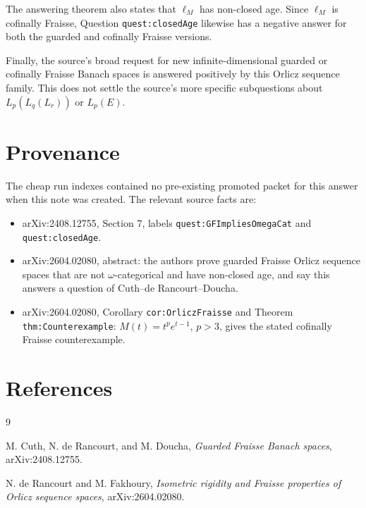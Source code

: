 \documentclass[11pt]{amsart}
\begin{document}
The answering theorem also states that \(\ell_M\) has non-closed age. Since
\(\ell_M\) is cofinally Fraisse, Question \texttt{quest:closedAge} likewise
has a negative answer for both the guarded and cofinally Fraisse versions.

Finally, the source's broad request for new infinite-dimensional guarded or
cofinally Fraisse Banach spaces is answered positively by this Orlicz sequence
family. This does not settle the source's more specific subquestions about
\(L_p(L_q(L_r))\) or \(L_p(E)\).

\section*{Provenance}

The cheap run indexes contained no pre-existing promoted packet for this
answer when this note was created. The relevant source facts are:
\begin{itemize}
\item arXiv:2408.12755, Section 7, labels \texttt{quest:GFImpliesOmegaCat}
and \texttt{quest:closedAge}.
\item arXiv:2604.02080, abstract: the authors prove guarded Fraisse Orlicz
sequence spaces that are not \(\omega\)-categorical and have non-closed age,
and say this answers a question of Cuth--de Rancourt--Doucha.
\item arXiv:2604.02080, Corollary \texttt{cor:OrliczFraisse} and Theorem
\texttt{thm:Counterexample}: \(M(t)=t^p e^{t-1}\), \(p>3\), gives the stated
cofinally Fraisse counterexample.
\end{itemize}

\section*{References}

\begin{thebibliography}{9}

M. Cuth, N. de Rancourt, and M. Doucha,
\emph{Guarded Fraisse Banach spaces}, arXiv:2408.12755.

N. de Rancourt and M. Fakhoury,
\emph{Isometric rigidity and Fraisse properties of Orlicz sequence spaces},
arXiv:2604.02080.

\end{thebibliography}
\end{document}
